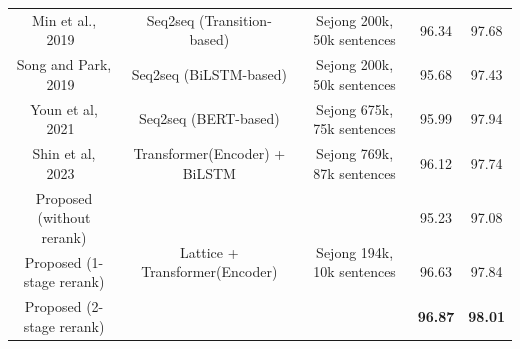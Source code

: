 \documentclass[AMS,STIX2COL]{WileyNJD-v2}
\begin{document}
\begin{table}[]
\begin{tabular*}{500pt}{@{\extracolsep\fill}ccc|cc@{\extracolsep\fill}}
            Min et al., 2019~\cite{MinJW2019}     & Seq2seq (Transition-based)                      & Sejong 200k, 50k sentences                  & 96.34                      & 97.68                        \\
            Song and Park, 2019~\cite{SongHJ2019} & Seq2seq (BiLSTM-based)                          & Sejong 200k, 50k sentences                  & 95.68                      & 97.43                        \\
            Youn et al, 2021~\cite{YounJY2021}    & Seq2seq (BERT-based)                            & Sejong 675k, 75k sentences                  & 95.99                      & 97.94                        \\
            Shin et al, 2023~\cite{ShinHJ2023}    & Transformer(Encoder) + BiLSTM                   & Sejong 769k, 87k sentences                  & 96.12                      & 97.74                        \\
            \midrule
            Proposed (without rerank)             & \multirow{3}{*}{Lattice + Transformer(Encoder)} & \multirow{3}{*}{Sejong 194k, 10k sentences} & 95.23                      & 97.08                        \\
            Proposed (1-stage rerank)             & ~                                               & ~                                           & 96.63                      & 97.84                        \\
            Proposed (2-stage rerank)             & ~                                               & ~                                           & \textbf{96.87}             & \textbf{98.01}               \\
            \bottomrule
        \end{tabular*}
    \end{table}
\end{document}
